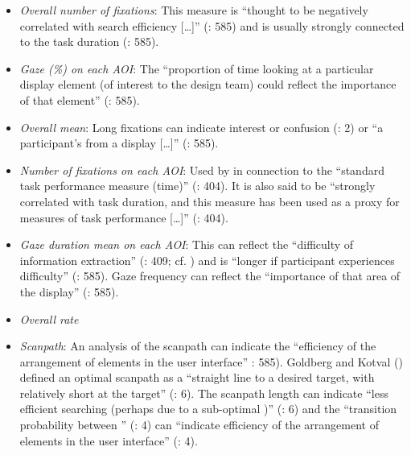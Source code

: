 \begin{itemize}
\item \textit{Overall number of fixations}: This measure is “thought to be negatively correlated with search efficiency […]” (\citealt{Jacob2003}: 585) and is usually strongly connected to the task duration (\citeyear{Jacob2003}: 585).
\item \textit{Gaze (\%) on each AOI}: The “proportion of time looking at a particular display element (of interest to the design team) could reflect the importance of that element” (\citealt{Jacob2003}: 585).
\item \textit{Overall  mean}: Long fixations can indicate interest or confusion (\citealt{Ehmke2007}: 2) or “a participant’s  from a display […]” (\citealt{Jacob2003}: 585).
\item \textit{Number of fixations on each AOI}: Used by \citet{Cowen2002} in connection to the “standard task performance measure (time)” (\citealt{mccarthy2003}: 404). It is also said to be “strongly correlated with task duration, and this measure has been used as a proxy for measures of task performance […]” (\citealt{mccarthy2003}: 404).
\item \textit{Gaze duration mean on each AOI}: This can reflect the “difficulty of information extraction” (\citealt{mccarthy2003}: 409; cf. \citealt{Fitts1950}) and is “longer if participant experiences difficulty” (\citealt{Jacob2003}: 585). Gaze frequency can reflect the “importance of that area of the display” (\citeyear{Jacob2003}: 585).
\item \textit{Overall  rate}
\item \textit{Scanpath}: An analysis of the scanpath can indicate the “efficiency of the arrangement of elements in the user interface” \citealt{Jacob2003}: 585). Goldberg and Kotval (\citeyear{Goldberg1999}) defined an optimal scanpath as a “straight line to a desired target, with relatively short  at the target” (\citealt{poole2005}: 6). The scanpath length can indicate “less efficient searching (perhaps due to a sub-optimal )” (\citeyear{poole2005}: 6) and the “transition probability between ” (\citealt{Ehmke2007}: 4) can “indicate efficiency of the arrangement of elements in the user interface” (\citeyear{Ehmke2007}: 4).
\end{itemize}

